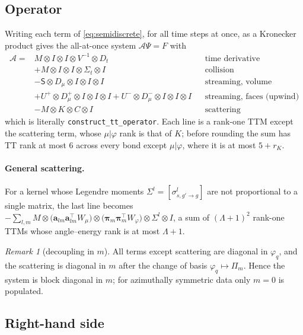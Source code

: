 \documentclass[11pt,a4paper]{article}
\numberwithin{equation}{section}
\theoremstyle{remark}
\newtheorem*{remark}{Remark}
\newcommand{\kron}{\otimes}
\newcommand{\Lmax}{\Lambda}
\begin{document}
\subsection{Operator}

Writing each term of \eqref{eq:semidiscrete}, for all time steps at once, as a Kronecker product gives the all-at-once system $\mathcal{A}\Psi=F$ with
\begin{equation}
\boxed{
\begin{aligned}
\mathcal{A}={}&M\kron I\kron I\kron V^{-1}\kron D_t
&&\text{time derivative}\\
&+M\kron I\kron I\kron\Sigma_t\kron I
&&\text{collision}\\
&-\mathsf{S}\kron D_\mu\kron I\kron I\kron I
&&\text{streaming, volume}\\
&+U^{+}\kron D_\mu^{+}\kron I\kron I\kron I
+U^{-}\kron D_\mu^{-}\kron I\kron I\kron I
&&\text{streaming, faces (upwind)}\\
&-M\kron K\kron C\kron I
&&\text{scattering}
\end{aligned}}
\label{eq:A}
\end{equation}
which is literally \texttt{construct\_tt\_operator}. Each line is a rank-one TTM except the scattering term, whose $\mu|\varphi$ rank is that of $K$; before rounding the sum has TT rank at most $6$ across every bond except $\mu|\varphi$, where it is at most $5+r_K$.

\paragraph{General scattering.} For a kernel whose Legendre moments $\Sigma^l=[\sigma^l_{s,g'\to g}]$ are not proportional to a single matrix, the last line becomes $-\sum_{l,m}M\kron\big(\bm a_{lm}\bm a_{lm}^{\!\top}W_\mu\big)\kron\big(\bm\pi_m\bm\pi_m^{\!\top}W_\varphi\big)\kron\Sigma^l\kron I$, a sum of $(\Lmax+1)^2$ rank-one TTMs whose angle--energy rank is at most $\Lmax+1$.

\begin{remark}[decoupling in $m$]
All terms except scattering are diagonal in $\varphi_q$, and the scattering is diagonal in $m$ after the change of basis $\varphi_q\mapsto\Pi_m$. Hence the system is block diagonal in $m$; for azimuthally symmetric data only $m=0$ is populated.
\end{remark}

\subsection{Right-hand side}
\end{document}
